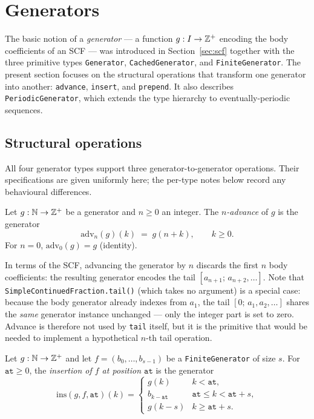 \section{Generators}
\label{sec:generators}

The basic notion of a \emph{generator} --- a function $g: I \to \mathbb{Z}^+$
encoding the body coefficients of an SCF --- was introduced in
Section~\ref{sec:scf} together with the three primitive types
\texttt{Generator}, \texttt{CachedGenerator}, and \texttt{FiniteGenerator}.
The present section focuses on the structural operations that transform
one generator into another: \texttt{advance}, \texttt{insert}, and
\texttt{prepend}.  It also describes \texttt{PeriodicGenerator}, which
extends the type hierarchy to eventually-periodic sequences.

\subsection{Structural operations}
\label{subsec:gen-ops}

All four generator types support three generator-to-generator operations.
Their specifications are given uniformly here; the per-type notes below
record any behavioural differences.

\begin{definition}[Advance]
  \label{def:advance}
  Let $g: \mathbb{N} \to \mathbb{Z}^+$ be a generator and $n \geq 0$ an integer.  The
  \emph{$n$-advance} of $g$ is the generator
  \[
    \mathrm{adv}_n(g)(k) \;=\; g(n + k), \qquad k \geq 0.
  \]
  For $n = 0$, $\mathrm{adv}_0(g) = g$ (identity).
\end{definition}

\begin{remark}
  In terms of the SCF, advancing the generator by $n$ discards the first $n$
  body coefficients: the resulting generator encodes the tail
  $[a_{n+1};\,a_{n+2},\ldots]$.  Note that
  \texttt{SimpleContinuedFraction.tail()} (which takes no argument) is a
  special case: because the body generator already indexes from $a_1$, the
  tail $[0;\,a_1,a_2,\ldots]$ shares the \emph{same} generator instance
  unchanged --- only the integer part is set to zero.  Advance is therefore
  not used by \texttt{tail} itself, but it is the primitive that would be
  needed to implement a hypothetical $n$-th tail operation.
\end{remark}

\begin{definition}[Insert]
  \label{def:insert}
  Let $g: \mathbb{N} \to \mathbb{Z}^+$ and let $f = (b_0, \ldots, b_{s-1})$ be a
  \texttt{FiniteGenerator} of size $s$.  For $\mathtt{at} \geq 0$, the
  \emph{insertion of $f$ at position $\mathtt{at}$} is the generator
  \[
    \mathrm{ins}(g,f,\mathtt{at})(k) =
    \begin{cases}
      g(k) & k < \mathtt{at}, \\
      b_{k - \mathtt{at}} & \mathtt{at} \leq k < \mathtt{at} + s, \\
      g(k - s) & k \geq \mathtt{at} + s.
    \end{cases}
  \]
\end{definition}

